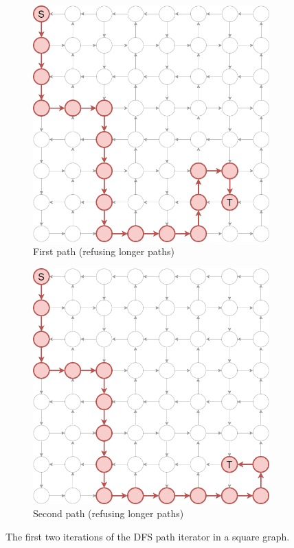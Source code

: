 \begin{figure}[ht]
\begin{subfigure}{.5\textwidth}
  \centering
\includegraphics[width=0.8\linewidth]{images/pathiterators/examples-DFS-1-RLP.png}
  \caption{First path (refusing longer paths)}
\end{subfigure}
\begin{subfigure}{.5\textwidth}
  \centering
\includegraphics[width=0.8\linewidth]{images/pathiterators/examples-DFS-2-RLP.png}
  \caption{Second path (refusing longer paths)}
\end{subfigure}
\caption{The first two iterations of the DFS path iterator in a square graph.}
\label{fig:pathexamples-dfs}
\end{figure}



